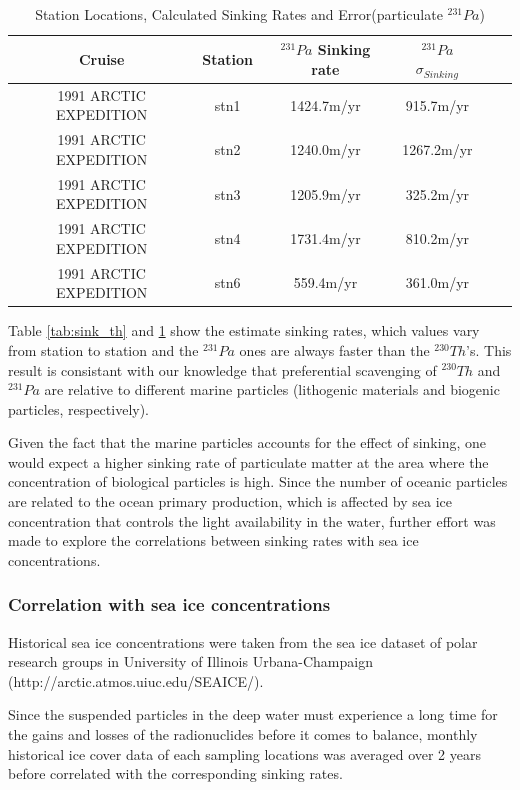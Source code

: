 \documentclass[paper=a4, fontsize=11pt]{scrartcl} %
\numberwithin{equation}{section} %
\numberwithin{figure}{section} %
\numberwithin{table}{section} %
\begin{document}
\begin{table}[!h]
\caption{Station Locations, Calculated Sinking Rates and Error(particulate $^{231}Pa$)}%
\centering
\begin{tabular}{ |c|c|c|c|c|c|}
\hline
 Cruise &Station& $^{231}Pa$ Sinking rate& $^{231}Pa$ $\sigma_{Sinking}$\\
\hline
1991 ARCTIC EXPEDITION&stn1&1424.7m/yr&915.7m/yr\\
1991 ARCTIC EXPEDITION&stn2&1240.0m/yr&1267.2m/yr\\
1991 ARCTIC EXPEDITION&stn3&1205.9m/yr&325.2m/yr\\
1991 ARCTIC EXPEDITION&stn4&1731.4m/yr&810.2m/yr\\
1991 ARCTIC EXPEDITION&stn6&559.4m/yr&361.0m/yr\\
\hline
\end{tabular}
\label{tab:sink_pa}
\end{table}

Table \ref{tab:sink_th} and \ref{tab:sink_pa} show the estimate sinking rates, which values vary from station to station and the $^{231}Pa$ ones are always faster than the $^{230}Th$'s. This result is consistant with our knowledge that preferential scavenging of $^{230}Th$ and  $^{231}Pa$ are relative to different marine particles (lithogenic materials and biogenic particles, respectively).

Given the fact that the marine particles accounts for the effect of sinking, one would expect a higher sinking rate of particulate matter at the area where the concentration of biological particles is high. Since the number of oceanic particles are related to the ocean primary production, which is affected by sea ice concentration that controls the light availability in the water, further effort was made to explore the correlations between sinking rates with sea ice concentrations. 

\subsubsection{Correlation with sea ice concentrations}

Historical sea ice concentrations were taken from the sea ice dataset of polar research groups in University of Illinois Urbana-Champaign (http://arctic.atmos.uiuc.edu/SEAICE/). 

Since the suspended particles in the deep water must experience a long time for the gains and losses of the radionuclides before it comes to balance, monthly historical ice cover data of each sampling locations was averaged over 2 years before correlated with the corresponding sinking rates. 
\end{document}
